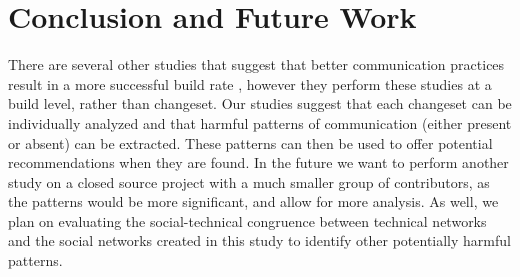\documentclass[conference]{IEEEtran}
\begin{document}
\section{Conclusion and Future Work}
There are several other studies that suggest that better communication practices result in a more successful build rate \cite{Wolf:2009:PBF:1555001.1555017}\cite{Schroter:2010:PBO:1810295.1810456}\cite{4721184}\cite{Zimmermann:2008:PDU:1368088.1368161}, however they perform these studies at a build level, rather than changeset.  Our studies suggest that each changeset can be individually analyzed and that harmful patterns of communication (either present or absent) can be extracted.  These patterns can then be used to offer potential recommendations when they are found.  In the future we want to perform another study on a closed source project with a much smaller group of contributors, as the patterns would be more significant, and allow for more analysis. As well, we plan on evaluating the social-technical congruence between technical networks and the social networks created in this study to identify other potentially harmful patterns. 




\end{document}
